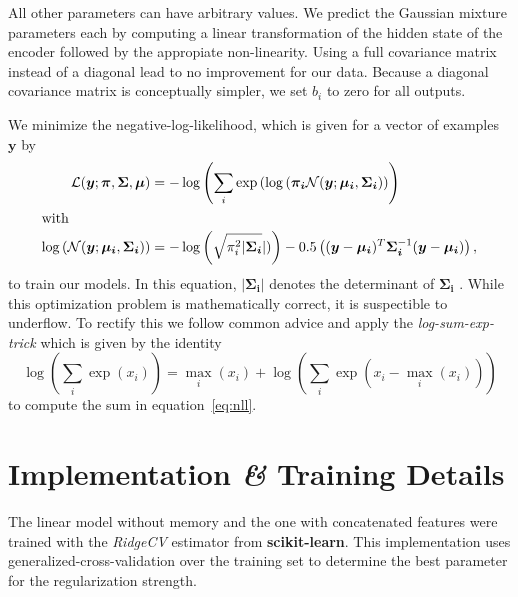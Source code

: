 \documentclass[nobib, a4paper]{tufte-handout}
\begin{document}
All other parameters can have arbitrary values.
We predict the Gaussian mixture parameters each by computing a linear transformation of the hidden state of the encoder followed by the appropiate non-linearity.
Using a full covariance matrix instead of a diagonal lead to no improvement for our data.
Because a diagonal covariance matrix is conceptually simpler, we set \(b_i\) to zero for all outputs.%

We minimize the negative-log-likelihood, which is given for a vector of examples \(\bm{y}\) by
\begin{align}
  \label{eq:nll}
 \mathcal{L} (\bm{y}; \bm{\pi}, \bm{\Sigma}, \bm{\mu}) &= - \log \left(  \sum_i \exp \left(  \log \left( \bm{\pi_i} \mathcal{N} (\bm{y}; \bm{\mu_i}, \bm{\Sigma_i} \right) \right) \right) \\ 
  \intertext{with}
  \log \left( \mathcal{N} (\bm{y}; \bm{\mu_i}, \bm{\Sigma_i}) \right) &= 
 -\log \left( \sqrt{\pi_i^2 \vert \bm{\Sigma_i}} \vert)  \right) - 0.5 \left( (\bm{y} - \bm{\mu_i})^T \bm{\Sigma_i}^{-1} (\bm{y} - \bm{\mu_i}) \right),\nonumber
\end{align}
to train our models.
In this equation, \(\vert \bm{\Sigma_i} \vert\) denotes the determinant of \(\bm{\Sigma_i}\)%
.
While this optimization problem is mathematically correct, it is suspectible to underflow.
To rectify this we follow common advice and apply the \textit{log-sum-exp-trick} which is given by the identity
\begin{equation*}
  \log \left( \sum_i \exp (x_i) \right) = \max_i (x_i) + \log \left( \sum_i \exp (x_i - \max_i (x_i)) \right)
\end{equation*}
to compute the sum in equation~\ref{eq:nll}\autocite{mdnMaster}.

\section{Implementation \textit{\&} Training Details}
The linear model without memory and the one with concatenated features were trained with the \textit{RidgeCV} estimator from \textbf{scikit-learn}\autocite{scikitLearn}.
This implementation uses generalized-cross-validation over the training set to determine the best parameter for the regularization strength.
\end{document}
